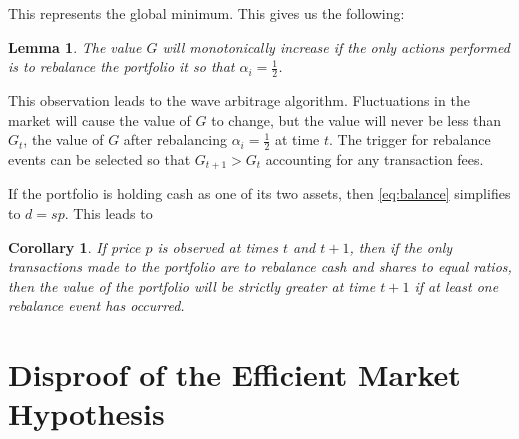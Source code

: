 \documentclass{article}
\newtheorem{corollary}{Corollary}
\newtheorem{lemma}{Lemma}
\begin{document}
This represents the global minimum. This gives us the
following:

\begin{lemma}
\label{lemma}
  The value $G$ will monotonically increase if the only actions performed is to
  rebalance the portfolio it so that $\alpha_i = \frac{1}{2}$.
\end{lemma}

This observation leads to the wave arbitrage algorithm. Fluctuations in the
market will cause the value of $G$ to change, but the value will never be less
than $G_t$, the value of $G$ after rebalancing $\alpha_i = \frac{1}{2}$ at
time $t$. The trigger for rebalance events can be selected so that
$G_{t+1} > G_t$ accounting for any transaction fees.

If the portfolio is holding cash as one of its two assets, then
\ref{eq:balance} simplifies to $d = s p$. This leads to

\begin{corollary}
  If price $p$ is observed at times $t$ and $t+1$, then if the only
  transactions made to the portfolio are to rebalance cash and shares to equal
  ratios, then the value of the portfolio will be strictly greater at time
  $t + 1$ if at least one rebalance event has occurred.
\end{corollary}

\section{Disproof of the Efficient Market Hypothesis}



\end{document}
